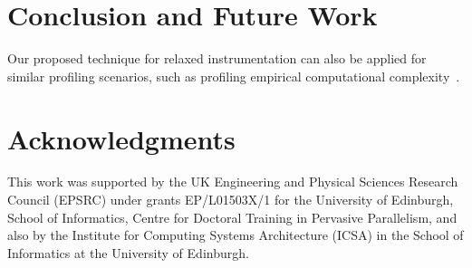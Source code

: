 \documentclass[sigplan,9pt]{acmart}
\begin{document}
\section{Conclusion and Future Work}

Our proposed technique for relaxed instrumentation can also be applied for similar
profiling scenarios, such as profiling empirical computational complexity~\cite{goldsmith07,zaparanuks12,coppa14}.

\section*{Acknowledgments}


This work was supported by the UK Engineering
and Physical Sciences Research Council (EPSRC) under grants
EP/L01503X/1 for the University of Edinburgh, School
of Informatics, Centre for Doctoral Training in Pervasive
Parallelism, %
and also by the Institute for Computing Systems Architecture (ICSA)
in the School of Informatics at the University of Edinburgh.


 
\end{document}
